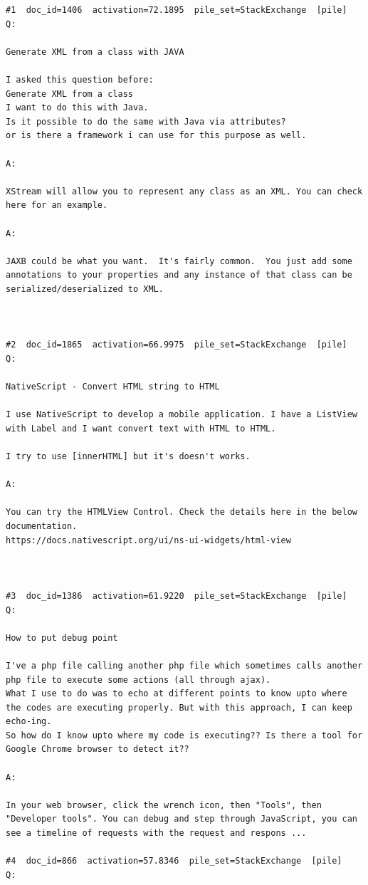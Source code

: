 \begin{verbatim}
#1  doc_id=1406  activation=72.1895  pile_set=StackExchange  [pile]
Q:

Generate XML from a class with JAVA

I asked this question before:
Generate XML from a class
I want to do this with Java.
Is it possible to do the same with Java via attributes?
or is there a framework i can use for this purpose as well.

A:

XStream will allow you to represent any class as an XML. You can check here for an example.

A:

JAXB could be what you want.  It's fairly common.  You just add some annotations to your properties and any instance of that class can be serialized/deserialized to XML.



#2  doc_id=1865  activation=66.9975  pile_set=StackExchange  [pile]
Q:

NativeScript - Convert HTML string to HTML

I use NativeScript to develop a mobile application. I have a ListView with Label and I want convert text with HTML to HTML.

I try to use [innerHTML] but it's doesn't works.

A:

You can try the HTMLView Control. Check the details here in the below documentation.
https://docs.nativescript.org/ui/ns-ui-widgets/html-view



#3  doc_id=1386  activation=61.9220  pile_set=StackExchange  [pile]
Q:

How to put debug point

I've a php file calling another php file which sometimes calls another php file to execute some actions (all through ajax).
What I use to do was to echo at different points to know upto where the codes are executing properly. But with this approach, I can keep echo-ing.
So how do I know upto where my code is executing?? Is there a tool for Google Chrome browser to detect it??

A:

In your web browser, click the wrench icon, then "Tools", then "Developer tools". You can debug and step through JavaScript, you can see a timeline of requests with the request and respons ...

#4  doc_id=866  activation=57.8346  pile_set=StackExchange  [pile]
Q:


\end{verbatim}
